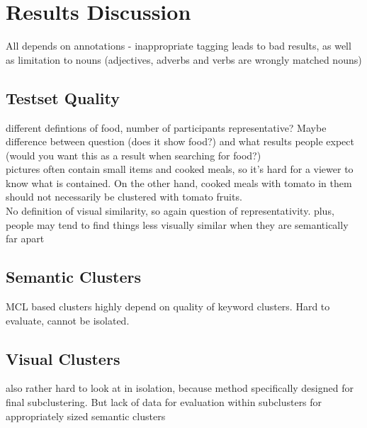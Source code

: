 %
\section{Results Discussion}
\label{sec_discussion}


All depends on annotations - inappropriate tagging leads to bad results, as well as limitation to nouns (adjectives, adverbs and verbs are wrongly matched nouns) \\

\subsection{Testset Quality}
different defintions of food, number of participants representative? Maybe difference between question (does it show food?) and what results people expect (would you want this as a result when searching for food?) \\
pictures often contain small items and cooked meals, so it's hard for a viewer to know what is contained. On the other hand, cooked meals with tomato in them should  not necessarily be clustered with tomato fruits. \\
No definition of visual similarity, so again question of representativity. plus, people may tend to find things less visually similar when they are semantically far apart

\subsection{Semantic Clusters}
MCL based clusters highly depend on quality of keyword clusters. Hard to evaluate, cannot be isolated.\\


\subsection{Visual Clusters}
also rather hard to look at in isolation, because method specifically designed for final subclustering. But lack of data for evaluation within subclusters for appropriately sized semantic clusters